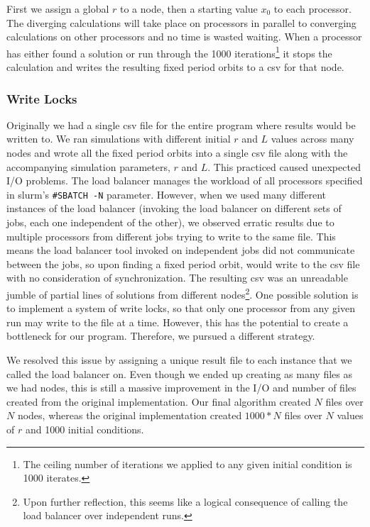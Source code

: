 \documentclass[12pt]{article}
\begin{document}
First we assign a global $r$ to a node, then a starting value $x_0$ to
each processor. The diverging calculations will take place on
processors in parallel to converging calculations on other processors
and no time is wasted waiting. When a processor has either found a
solution or run through the 1000 iterations\footnote{The ceiling
  number of iterations we applied to any given initial condition is
  1000 iterates.} it stops the calculation and writes the resulting
fixed period orbits to a csv for that node. 

\subsubsection{Write Locks}
\hspace{5mm}Originally we had a single csv file for the entire program
where results would be written to. We ran simulations with different
initial $r$ and $L$ values across many nodes and wrote all the fixed
period orbits into a single csv file along with the accompanying
simulation parameters, $r$ and $L$. This practiced caused unexpected
I/O problems. The load balancer manages the workload of all processors
specified in slurm's \texttt{\#SBATCH -N} parameter. However, when we
used many different instances of the load balancer (invoking the load
balancer on different sets of jobs, each one independent of the
other), we observed erratic results due to multiple processors from
different jobs trying to write to the same file. This means the load
balancer tool invoked on independent jobs did not communicate between
the jobs, so upon finding a fixed period orbit, would write to the csv
file with no consideration of synchronization. The resulting csv was
an unreadable jumble of partial lines of solutions from different
nodes\footnote{Upon further reflection, this seems like a logical
  consequence of calling the load balancer over independent
  runs.}. One possible solution is to implement a system of write
locks, so that only one processor from any given run may write to the
file at a time. However, this has the potential to create a bottleneck
for our program. Therefore, we pursued a different strategy.

We resolved this issue by assigning a unique result file to each
instance that we called the load balancer on. Even though we ended up
creating as many files as we had nodes, this is still a massive
improvement in the I/O and number of files created from the original
implementation. Our final algorithm created $N$ files over $N$ nodes,
whereas the original implementation created $1000*N$ files over $N$ values
of $r$ and 1000 initial conditions.
\end{document}
